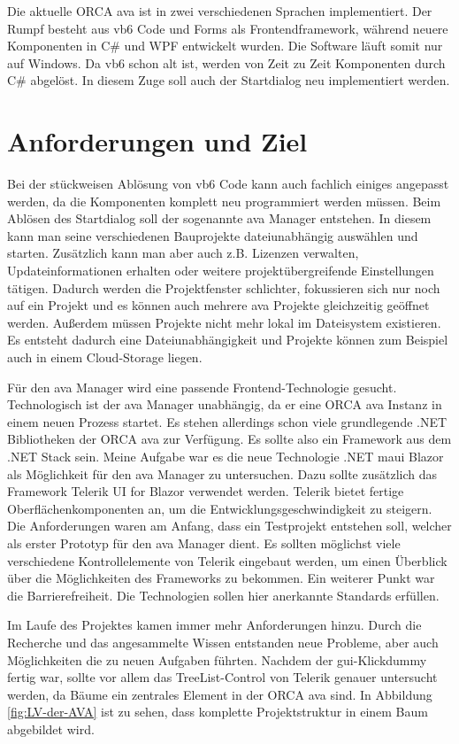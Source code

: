Die aktuelle ORCA \ac{ava} ist in zwei verschiedenen Sprachen implementiert. Der Rumpf besteht aus \ac{vb6} Code und Forms als Frontendframework, während neuere Komponenten in C\# und WPF entwickelt wurden. Die Software läuft somit nur auf Windows. Da \ac{vb6} schon alt ist, werden von Zeit zu Zeit Komponenten durch C\# abgelöst. In diesem Zuge soll auch der Startdialog neu implementiert werden.

\section{Anforderungen und Ziel}
Bei der stückweisen Ablösung von \ac{vb6} Code kann auch fachlich einiges angepasst werden, da die Komponenten komplett neu programmiert werden müssen.
Beim Ablösen des Startdialog soll der sogenannte \ac{ava} Manager entstehen. In diesem kann man seine verschiedenen Bauprojekte dateiunabhängig auswählen und starten. Zusätzlich kann man aber auch z.B. Lizenzen verwalten, Updateinformationen erhalten oder weitere projektübergreifende Einstellungen tätigen. Dadurch werden die Projektfenster schlichter, fokussieren sich nur noch auf ein Projekt und es können auch mehrere \ac{ava} Projekte gleichzeitig geöffnet werden. Außerdem müssen Projekte nicht mehr lokal im Dateisystem existieren. Es entsteht dadurch eine Dateiunabhängigkeit und Projekte können zum Beispiel auch in einem Cloud-Storage liegen.

Für den \ac{ava} Manager wird eine passende Frontend-Technologie gesucht. Technologisch ist der \ac{ava} Manager unabhängig, da er eine ORCA \ac{ava} Instanz in einem neuen Prozess startet. Es stehen allerdings schon viele grundlegende .NET Bibliotheken der ORCA \ac{ava} zur Verfügung. Es sollte also ein Framework aus dem .NET Stack sein. Meine Aufgabe war es die neue Technologie .NET \ac{maui} Blazor als Möglichkeit für den \ac{ava} Manager zu untersuchen.
Dazu sollte zusätzlich das Framework Telerik UI for Blazor verwendet werden. Telerik bietet fertige Oberflächenkomponenten an, um die Entwicklungsgeschwindigkeit zu steigern.
Die Anforderungen waren am Anfang, dass ein Testprojekt entstehen soll, welcher als erster Prototyp für den \ac{ava} Manager dient. Es sollten möglichst viele verschiedene Kontrollelemente von Telerik eingebaut werden, um einen Überblick über die Möglichkeiten des Frameworks zu bekommen. Ein weiterer Punkt war die Barrierefreiheit. Die Technologien sollen hier anerkannte Standards erfüllen.

Im Laufe des Projektes kamen immer mehr Anforderungen hinzu. Durch die Recherche und das angesammelte Wissen entstanden neue Probleme, aber auch Möglichkeiten die zu neuen Aufgaben führten. Nachdem der \ac{gui}-Klickdummy fertig war, sollte vor allem das TreeList-Control von Telerik genauer untersucht werden, da Bäume ein zentrales Element in der ORCA \ac{ava} sind. In Abbildung \ref{fig:LV-der-AVA} ist zu sehen, dass komplette Projektstruktur in einem Baum abgebildet wird.

